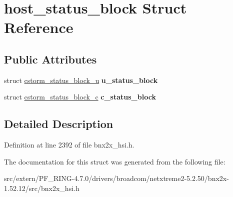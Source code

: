 \hypertarget{structhost__status__block}{
\section{host\_\-status\_\-block Struct Reference}
\label{structhost__status__block}
}
\subsection*{Public Attributes}
\begin{DoxyCompactItemize}
\item 
\hypertarget{structhost__status__block_a8f6995b9d7b77a07d80d3f74ae28d6b1}{
struct \hyperlink{structcstorm__status__block__u}{cstorm\_\-status\_\-block\_\-u} {\bfseries u\_\-status\_\-block}}
\label{structhost__status__block_a8f6995b9d7b77a07d80d3f74ae28d6b1}

\item 
\hypertarget{structhost__status__block_ae21f36f4ae7701f099ec7cbe9bd5a139}{
struct \hyperlink{structcstorm__status__block__c}{cstorm\_\-status\_\-block\_\-c} {\bfseries c\_\-status\_\-block}}
\label{structhost__status__block_ae21f36f4ae7701f099ec7cbe9bd5a139}

\end{DoxyCompactItemize}


\subsection{Detailed Description}


Definition at line 2392 of file bnx2x\_\-hsi.h.



The documentation for this struct was generated from the following file:\begin{DoxyCompactItemize}
\item 
src/extern/PF\_\-RING-\/4.7.0/drivers/broadcom/netxtreme2-\/5.2.50/bnx2x-\/1.52.12/src/bnx2x\_\-hsi.h\end{DoxyCompactItemize}
